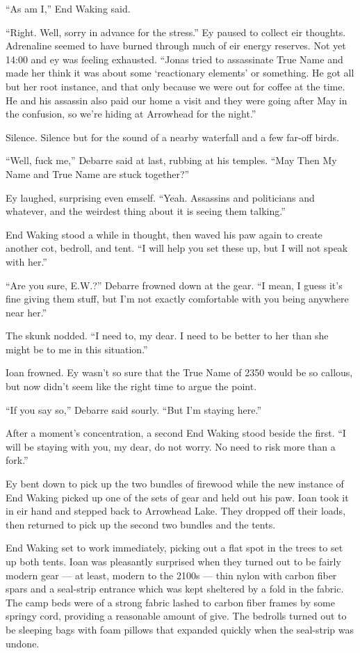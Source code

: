 ``As am I,'' End Waking said.

``Right. Well, sorry in advance for the stress.'' Ey paused to collect eir thoughts. Adrenaline seemed to have burned through much of eir energy reserves. Not yet 14:00 and ey was feeling exhausted. ``Jonas tried to assassinate True Name and made her think it was about some `reactionary elements' or something. He got all but her root instance, and that only because we were out for coffee at the time. He and his assassin also paid our home a visit and they were going after May in the confusion, so we're hiding at Arrowhead for the night.''

Silence. Silence but for the sound of a nearby waterfall and a few far-off birds.

``Well, fuck me,'' Debarre said at last, rubbing at his temples. ``May Then My Name and True Name are stuck together?''

Ey laughed, surprising even emself. ``Yeah. Assassins and politicians and whatever, and the weirdest thing about it is seeing them talking.''

End Waking stood a while in thought, then waved his paw again to create another cot, bedroll, and tent. ``I will help you set these up, but I will not speak with her.''

``Are you sure, E.W.?'' Debarre frowned down at the gear. ``I mean, I guess it's fine giving them stuff, but I'm not exactly comfortable with you being anywhere near her.''

The skunk nodded. ``I need to, my dear. I need to be better to her than she might be to me in this situation.''

Ioan frowned. Ey wasn't so sure that the True Name of 2350 would be so callous, but now didn't seem like the right time to argue the point.

``If you say so,'' Debarre said sourly. ``But I'm staying here.''

After a moment's concentration, a second End Waking stood beside the first. ``I will be staying with you, my dear, do not worry. No need to risk more than a fork.''

Ey bent down to pick up the two bundles of firewood while the new instance of End Waking picked up one of the sets of gear and held out his paw. Ioan took it in eir hand and stepped back to Arrowhead Lake. They dropped off their loads, then returned to pick up the second two bundles and the tents.

End Waking set to work immediately, picking out a flat spot in the trees to set up both tents. Ioan was pleasantly surprised when they turned out to be fairly modern gear — at least, modern to the 2100s — thin nylon with carbon fiber spars and a seal-strip entrance which was kept sheltered by a fold in the fabric. The camp beds were of a strong fabric lashed to carbon fiber frames by some springy cord, providing a reasonable amount of give. The bedrolls turned out to be sleeping bags with foam pillows that expanded quickly when the seal-strip was undone.

